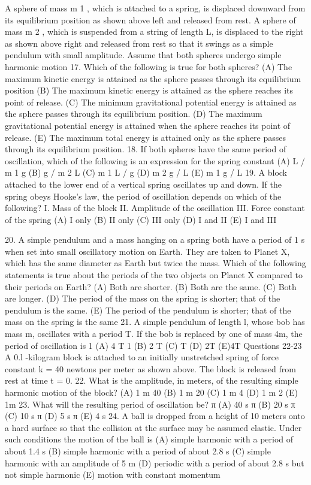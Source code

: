 A sphere of mass m 1 , which is attached to a spring, is displaced downward from its equilibrium position as shown
above left and released from rest. A sphere of mass m 2 , which is suspended from a string of length L, is displaced to
the right as shown above right and released from rest so that it swings as a simple pendulum with small amplitude.
Assume that both spheres undergo simple harmonic motion
17. Which of the following is true for both spheres?
(A) The maximum kinetic energy is attained as the sphere passes through its equilibrium position
(B) The maximum kinetic energy is attained as the sphere reaches its point of release.
(C) The minimum gravitational potential energy is attained as the sphere passes through its equilibrium position.
(D) The maximum gravitational potential energy is attained when the sphere reaches its point of release.
(E) The maximum total energy is attained only as the sphere passes through its equilibrium position.
18. If both spheres have the same period of oscillation, which of the following is an expression for the spring
constant
(A) L / m 1 g
(B) g / m 2 L
(C) m 1 L / g
(D) m 2 g / L
(E) m 1 g / L
19. A block attached to the lower end of a vertical spring oscillates up and down. If the spring obeys
Hooke's law, the period of oscillation depends on which of the following?
I. Mass of the block
II. Amplitude of the oscillation
III. Force constant of the spring
(A) I only
(B) II only
(C) III only
(D) I and II
(E) I and III



20. A simple pendulum and a mass hanging on a spring both have a period of 1 s when set into small oscillatory
motion on Earth. They are taken to Planet X, which has the same diameter as Earth but twice the mass. Which of the
following statements is true about the periods of the two objects on Planet X compared to their periods on Earth?
(A) Both are shorter.
(B) Both are the same.
(C) Both are longer.
(D) The period of the mass on the spring is shorter; that of the pendulum is the same.
(E) The period of the pendulum is shorter; that of the mass on the spring is the same
21. A simple pendulum of length l, whose bob has mass m, oscillates with a period T. If the bob is replaced by one
of mass 4m, the period of oscillation is
1
(A) 4 T
1
(B) 2 T
(C) T
(D) 2T
(E)4T
Questions 22-23
A 0.l -kilogram block is attached to an initially unstretched spring of force constant k = 40 newtons per meter as
shown above. The block is released from rest at time t = 0.
22. What is the amplitude, in meters, of the resulting simple harmonic motion of the block?
(A)
1
m
40
(B)
1
m
20
(C)
1
m
4
(D)
1
m
2
(E) 1m
23. What will the resulting period of oscillation be?
π
(A)
40
s
π
(B)
20
s
π
(C)
10
s
π
(D)
5
s
π
(E)
4
s
24. A ball is dropped from a height of 10 meters onto a hard surface so that the collision at the surface may be
assumed elastic. Under such conditions the motion of the ball is
(A) simple harmonic with a period of about 1.4 s
(B) simple harmonic with a period of about 2.8 s
(C) simple harmonic with an amplitude of 5 m
(D) periodic with a period of about 2.8 s but not simple harmonic
(E) motion with constant momentum



